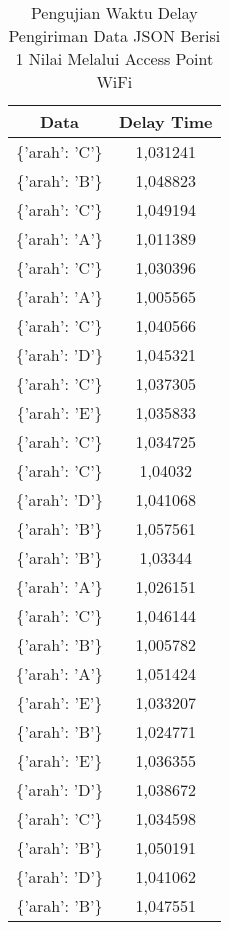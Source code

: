 \begin{table}[!h]
\centering
  \caption{Pengujian Waktu Delay Pengiriman Data JSON Berisi 1 Nilai Melalui Access Point WiFi}
  \label{tbl:delayWiFiJSON1}
  \begin{tabular}{|c|c|}
  \hline
  Data               & Delay Time  \\ \hline
  \{'arah': 'C'\}    & 1,031241    \\ \hline
  \{'arah': 'B'\}    & 1,048823    \\ \hline
  \{'arah': 'C'\}    & 1,049194    \\ \hline
  \{'arah': 'A'\}    & 1,011389    \\ \hline
  \{'arah': 'C'\}    & 1,030396    \\ \hline
  \{'arah': 'A'\}    & 1,005565    \\ \hline
  \{'arah': 'C'\}    & 1,040566    \\ \hline
  \{'arah': 'D'\}    & 1,045321    \\ \hline
  \{'arah': 'C'\}    & 1,037305    \\ \hline
  \{'arah': 'E'\}    & 1,035833    \\ \hline
  \{'arah': 'C'\}    & 1,034725    \\ \hline
  \{'arah': 'C'\}    & 1,04032     \\ \hline
  \{'arah': 'D'\}    & 1,041068    \\ \hline
  \{'arah': 'B'\}    & 1,057561    \\ \hline
  \{'arah': 'B'\}    & 1,03344     \\ \hline
  \{'arah': 'A'\}    & 1,026151    \\ \hline
  \{'arah': 'C'\}    & 1,046144    \\ \hline
  \{'arah': 'B'\}    & 1,005782    \\ \hline
  \{'arah': 'A'\}    & 1,051424    \\ \hline
  \{'arah': 'E'\}    & 1,033207    \\ \hline
  \{'arah': 'B'\}    & 1,024771    \\ \hline
  \{'arah': 'E'\}    & 1,036355    \\ \hline
  \{'arah': 'D'\}    & 1,038672    \\ \hline
  \{'arah': 'C'\}    & 1,034598    \\ \hline
  \{'arah': 'B'\}    & 1,050191    \\ \hline
  \{'arah': 'D'\}    & 1,041062    \\ \hline
  \{'arah': 'B'\}    & 1,047551    \\ \hline

\end{tabular}
\end{table}
